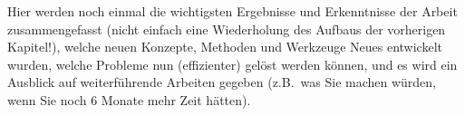 Hier werden noch einmal die wichtigsten Ergebnisse und Erkenntnisse
der Arbeit zusammengefasst (nicht einfach eine Wiederholung des
Aufbaus der vorherigen Kapitel!), welche neuen Konzepte, Methoden und
Werkzeuge Neues entwickelt wurden, welche Probleme nun (effizienter)
gelöst werden können, und es wird ein Ausblick auf weiterführende
Arbeiten gegeben (z.B.~was Sie machen würden, wenn Sie noch 6 Monate
mehr Zeit hätten).